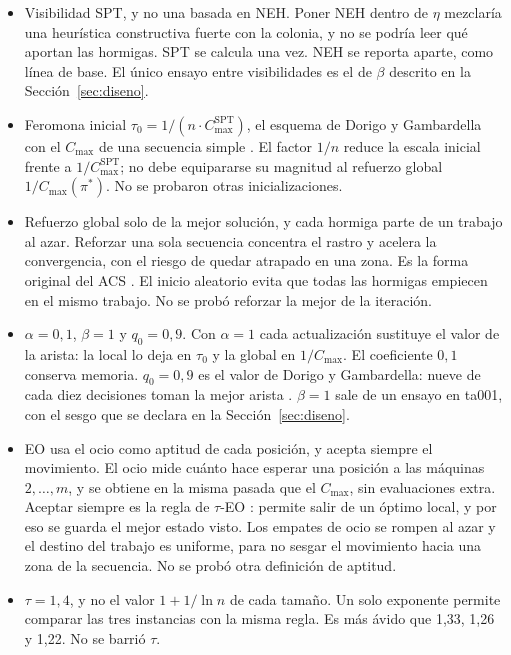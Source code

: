 \documentclass[journal]{IEEEtran}
\begin{document}
\begin{itemize}
  \item Visibilidad SPT, y no una basada en NEH. Poner NEH dentro de $\eta$ mezclaría una heurística constructiva fuerte con la colonia, y no se podría leer qué aportan las hormigas. SPT se calcula una vez. NEH se reporta aparte, como línea de base. El único ensayo entre visibilidades es el de $\beta$ descrito en la Sección~\ref{sec:diseno}.
  \item Feromona inicial $\tau_0=1/(n\cdot C_{\max}^{\mathrm{SPT}})$, el esquema de Dorigo y Gambardella con el $C_{\max}$ de una secuencia simple \cite{dorigo_ant_1997}. El factor $1/n$ reduce la escala inicial frente a $1/C_{\max}^{\mathrm{SPT}}$; no debe equipararse su magnitud al refuerzo global $1/C_{\max}(\pi^{*})$. No se probaron otras inicializaciones.
  \item Refuerzo global solo de la mejor solución, y cada hormiga parte de un trabajo al azar. Reforzar una sola secuencia concentra el rastro y acelera la convergencia, con el riesgo de quedar atrapado en una zona. Es la forma original del ACS \cite{dorigo_ant_1997}. El inicio aleatorio evita que todas las hormigas empiecen en el mismo trabajo. No se probó reforzar la mejor de la iteración.
  \item $\alpha=0{,}1$, $\beta=1$ y $q_0=0{,}9$. Con $\alpha=1$ cada actualización sustituye el valor de la arista: la local lo deja en $\tau_0$ y la global en $1/C_{\max}$. El coeficiente $0{,}1$ conserva memoria. $q_0=0{,}9$ es el valor de Dorigo y Gambardella: nueve de cada diez decisiones toman la mejor arista \cite{dorigo_ant_1997}. $\beta=1$ sale de un ensayo en ta001, con el sesgo que se declara en la Sección~\ref{sec:diseno}.
  \item EO usa el ocio como aptitud de cada posición, y acepta siempre el movimiento. El ocio mide cuánto hace esperar una posición a las máquinas $2,\ldots,m$, y se obtiene en la misma pasada que el $C_{\max}$, sin evaluaciones extra. Aceptar siempre es la regla de $\tau$-EO \cite{boettcher_natures_2000}: permite salir de un óptimo local, y por eso se guarda el mejor estado visto. Los empates de ocio se rompen al azar y el destino del trabajo es uniforme, para no sesgar el movimiento hacia una zona de la secuencia. No se probó otra definición de aptitud.
  \item $\tau=1{,}4$, y no el valor $1+1/\ln n$ de cada tamaño. Un solo exponente permite comparar las tres instancias con la misma regla. Es más ávido que 1,33, 1,26 y 1,22. No se barrió $\tau$.
\end{itemize}
\end{document}
